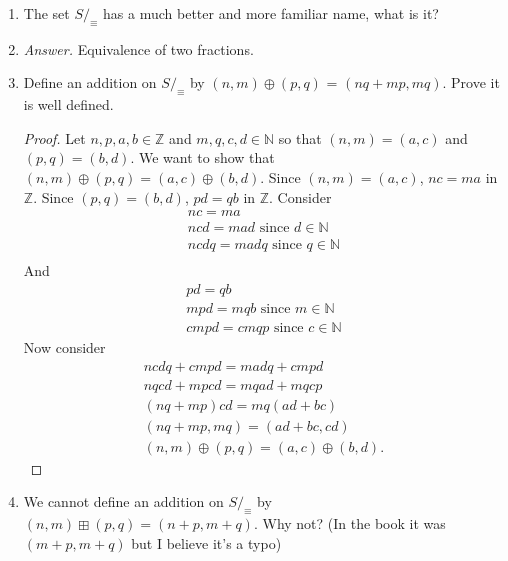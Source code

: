 \documentclass{article}
\theoremstyle{claim}
\theoremstyle{definition}
\begin{document}
\begin{enumerate}
\begin{enumerate}
\begin{proof}
\begin{enumerate}
                        This means $(m, q) \equiv (p, s)$.
                \end{enumerate}
            \end{proof}
            \item The set $S/_{\equiv}$ has a much better and more familiar name, what is it?
            \item[] \emph{Answer. } Equivalence of two fractions.
            \item Define an addition on $S/_{\equiv}$ by $(n, m) \oplus (p, q)$ = $(nq + mp, mq)$. Prove it is well defined.
            \begin{proof}
                Let $n, p, a, b \in \mathbb{Z}$ and $m, q, c, d \in \mathbb{N}$ so that $(n, m) = (a, c)$ and $(p, q) = (b, d)$. We want to show that $(n, m) \oplus (p, q) = (a, c) \oplus (b, d)$. Since $(n, m) = (a, c)$, $nc = ma$ in $\mathbb{Z}$. Since $(p, q) = (b, d)$, $pd = qb$ in $\mathbb{Z}$. Consider
                \begin{gather*}
                    nc = ma\\
                    ncd = mad \text{ since } d \in \mathbb{N}\\
                    ncdq = madq \text{ since } q \in \mathbb{N}\\
                \end{gather*}
                And
                \begin{gather*}
                    pd = qb\\
                    mpd = mqb \text{ since } m \in \mathbb{N}\\
                    cmpd = cmqp \text{ since } c \in \mathbb{N}
                \end{gather*}
                Now consider
                \begin{gather*}
                    ncdq + cmpd = madq + cmpd\\
                    nqcd + mpcd = mqad + mqcp\\
                    (nq + mp)cd = mq(ad + bc)\\
                    (nq + mp, mq) = (ad + bc, cd)\\
                    (n, m) \oplus (p, q) = (a, c) \oplus (b, d).
                \end{gather*}
            \end{proof}
        \item We cannot define an addition on $S/_{\equiv}$ by $(n, m) \boxplus (p, q) = (n + p, m + q)$. Why not? (In the book it was $(m + p, m + q)$ but I believe it's a typo)

\end{enumerate}
\end{enumerate}
\end{document}
